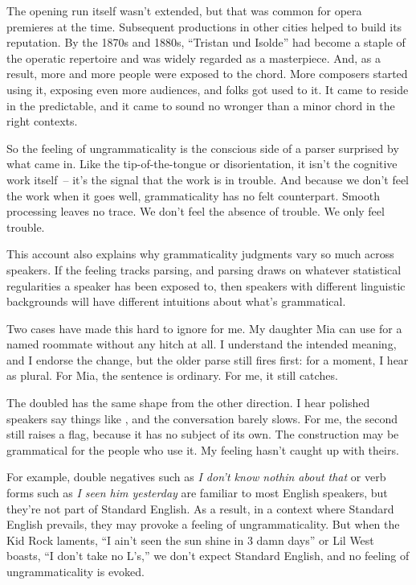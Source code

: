 The opening run itself wasn't extended, but that was common for opera premieres at the time. Subsequent productions in other cities helped to build its reputation. By the 1870s and 1880s, ``Tristan und Isolde'' had become a staple of the operatic repertoire and was widely regarded as a masterpiece. And, as a result, more and more people were exposed to the chord. More composers started using it, exposing even more audiences, and folks got used to it. It came to reside in the predictable, and it came to sound no wronger than a minor chord in the right contexts.

\bigskip

So the feeling of ungrammaticality is the conscious side of a parser surprised by what came in. Like the tip-of-the-tongue or disorientation, it isn't the cognitive work itself~-- it's the signal that the work is in trouble. And because we don't feel the work when it goes well, grammaticality has no felt counterpart. Smooth processing leaves no trace. We don't feel the absence of trouble. We only feel trouble.

\bigskip

This account also explains why grammaticality judgments vary so much across speakers. If the feeling tracks parsing, and parsing draws on whatever statistical regularities a speaker has been exposed to, then speakers with different linguistic backgrounds will have different intuitions about what's grammatical.

Two cases have made this hard to ignore for me. My daughter Mia can use  for a named roommate without any hitch at all. I understand the intended meaning, and I endorse the change, but the older parse still fires first: for a moment, I hear  as plural. For Mia, the sentence is ordinary. For me, it still catches.

The doubled  has the same shape from the other direction. I hear polished speakers say things like , and the conversation barely slows. For me, the second  still raises a flag, because it has no subject of its own. The construction may be grammatical for the people who use it. My feeling hasn't caught up with theirs.

For example, double negatives such as \textit{I don't know nothin about that} or verb forms such as \textit{I seen him yesterday} are familiar to most English speakers, but they're not part of Standard English. As a result, in a context where Standard English prevails, they may provoke a feeling of ungrammaticality. But when the Kid Rock laments, ``I ain't seen the sun shine in 3 damn days'' or Lil West boasts, ``I don't take no L's,'' we don't expect Standard English, and no feeling of ungrammaticality is evoked.

